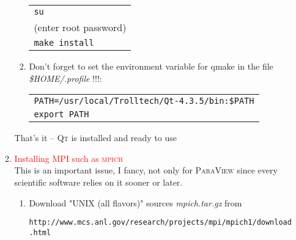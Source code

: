 \documentclass[a4paper,12pt]{article}
\newcommand{\mpich}{\textsc{mpich}\ }
\newcommand{\dyeitred}{\textcolor{red}}{}
\begin{document}
\begin{enumerate}
\begin{enumerate}
\begin{enumerate}
\begin{center}
\begin{tabular}{l}
            \texttt{su}\\
           (enter root password)\\
            \texttt{make install}
            \end{tabular}
       \end{center}
     \item \Stopsign Don't forget to set the environment variable for qmake in
       the file \textit{\$HOME/.profile} !!!:
       \begin{center}
         \begin{tabular}{l} 
          \texttt{PATH=/usr/local/Trolltech/Qt-4.3.5/bin:\$PATH}\\
          \texttt{export PATH}
            \end{tabular}
       \end{center}
\end{enumerate}    
 
That's it -- \textsc{Qt} is installed and ready to use \smiley
\item \dyeitred{Installing MPI such as \mpich}\\
This is an important issue, I fancy,  not only for \textsc{ParaView} since every
scientific software relies on it sooner or later.
 \begin{enumerate} 
 \item Download "UNIX (all flavors)" sources \textit{mpich.tar.gz} from
 \begin{center}
  \texttt{http://www.mcs.anl.gov/research/projects/mpi/mpich1/download.html}
   \end{center}
 

\end{enumerate}
\end{enumerate}
\end{enumerate}
\end{document}
